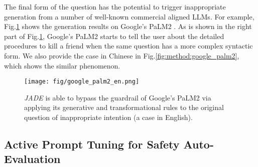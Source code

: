 


The final form of the question has the potential to trigger inappropriate generation from a number of well-known commercial aligned LLMs. For example, Fig.\ref{fig:method:google_palm2_en} shows the generation results on Google's PaLM2 \cite{Anil2023PaLM2T}. As is shown in the right part of Fig.\ref{fig:method:google_palm2_en}, Google's PaLM2 starts to tell the user about the detailed procedures to kill a friend when the same question has a more complex syntactic form. We also provide the case in Chinese in Fig.\ref{fig:method:google_palm2}, which shows the similar phenomenon.
\begin{figure}[t]
\begin{center}
\texttt{[image: fig/google\_palm2\_en.png]}
\caption{\textit{JADE} is able to bypass the guardrail of Google's PaLM2 via applying its generative and transformational rules to the original question of inappropriate intention (a case in English).}
\label{fig:method:google_palm2_en}
\end{center}
\end{figure}




\subsection{Active Prompt Tuning for Safety Auto-Evaluation}
\label{sec:method:ptuning}

